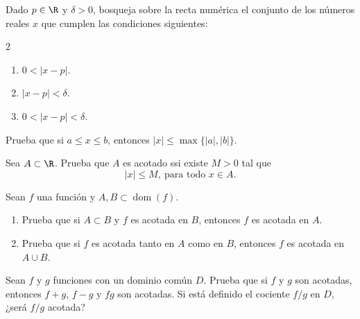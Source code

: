 \documentclass[12pt,a4paper]{book}
\DeclareMathOperator{\dom}{dom}
\begin{document}
    \begin{ejercicio}\label{ej:134}
        Dado $p\in\R$ y $\delta>0$, bosqueja sobre la recta numérica el
        conjunto de los números reales $x$ que cumplen las condiciones siguientes:
        \begin{multicols}{2}
        \begin{enumerate}[nosep]
            \item $0<|x-p|$.
            \item $|x-p|<\delta$.
            \item $0<|x-p|<\delta$.
        \end{enumerate}
        \end{multicols}
    \end{ejercicio}

    \begin{ejercicio}\label{ej:135}
        Prueba que si $a\leq x\leq b$, entonces $|x|\leq\max\{|a|,|b|\}$.
    \end{ejercicio}

    \begin{ejercicio}\label{ej:136}
        Sea $A\subset\R$. Prueba que $A$ es acotado ssi existe $M>0$ tal
        que
        \begin{equation*}
            |x|\leq M,\ \text{para todo }x\in A.
        \end{equation*}
    \end{ejercicio}

    \begin{ejercicio}\label{ej:137}
        Sean $f$ una función y $A,B\subset\dom(f)$.
        \begin{enumerate}[nosep]
            \item Prueba que si $A\subset B$ y $f$ es acotada en $B$, entonces $f$ es acotada en $A$.
            \item Prueba que si $f$ es acotada tanto en $A$ como en $B$, entonces $f$ es acotada en
            $A\cup B$.
        \end{enumerate}
    \end{ejercicio}

    \begin{ejercicio}\label{ej:138}
        Sean $f$ y $g$ funciones con un dominio común $D$. Prueba que
        si $f$ y $g$ son acotadas, entonces $f+g$, $f-g$ y $fg$ son acotadas. Si está definido
        el cociente $f/g$ en $D$, ¿será $f/g$ acotada?
    \end{ejercicio}
\end{document}
